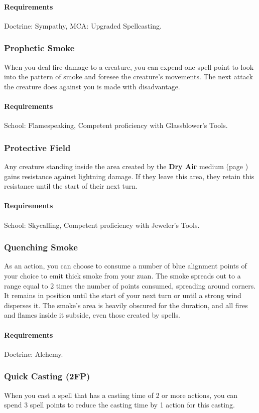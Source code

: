     \paragraph{Requirements} Doctrine: Sympathy, MCA: Upgraded Spellcasting.
\subsubsection{Prophetic Smoke} \label{feat::propheticsmoke}
    When you deal fire damage to a creature, you can expend one spell point to look into the pattern of smoke and foresee the creature's movements.
    The next attack the creature does against you is made with disadvantage.
    \paragraph{Requirements} School: Flamespeaking, Competent proficiency with Glassblower's Tools.
\subsubsection{Protective Field} \label{feat::protectivefield}
    Any creature standing inside the area created by the \textbf{Dry Air} medium (page \pageref{medium::dryair}) gains resistance against lightning damage.
    If they leave this area, they retain this resistance until the start of their next turn.
    \paragraph{Requirements} School: Skycalling, Competent proficiency with Jeweler's Tools.
\subsubsection{Quenching Smoke} \label{feat::quenchingsmoke}
    As an action, you can choose to consume a number of blue alignment points of your choice to emit thick smoke from your zuan.
    The smoke spreads out to a range equal to 2 times the number of points consumed, spreading around corners.
    It remains in position until the start of your next turn or until a strong wind disperses it.
    The smoke's area is heavily obscured for the duration, and all fires and flames inside it subside, even those created by spells.
    \paragraph{Requirements} Doctrine: Alchemy.
\subsubsection{Quick Casting (2FP)} \label{feat::quickcasting}
    When you cast a spell that has a casting time of 2 or more actions, you can spend 3 spell points to reduce the casting time by 1 action for this casting.
